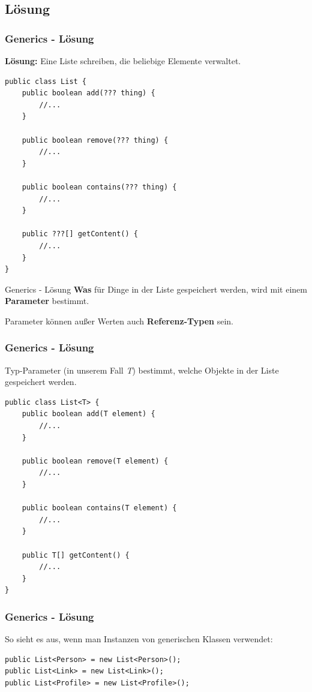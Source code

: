 \documentclass[18pt]{beamer}
\begin{document}

\subsection*{Lösung}
\begin{frame}[containsverbatim]
	\frametitle{Generics - Lösung}
	\textbf{Lösung:} Eine Liste schreiben, die beliebige Elemente verwaltet.
	\begin{lstlisting}
public class List {
	public boolean add(??? thing) {
		//...
	}
	
	public boolean remove(??? thing) {
		//...
	}
	
	public boolean contains(??? thing) {
		//...
	}
	
	public ???[] getContent() {
		//...
	}
}
	\end{lstlisting}
\end{frame}


\begin{frame}{Generics - Lösung}
	\textbf{Was} für Dinge in der Liste gespeichert werden, wird mit einem \textbf{Parameter} bestimmt.\pause
	
	Parameter können außer Werten auch \textbf{Referenz-Typen} sein.
\end{frame}


\begin{frame}[containsverbatim]
	\frametitle{Generics - Lösung}
	Typ-Parameter (in unserem Fall \emph{T}) bestimmt, welche Objekte in der Liste gespeichert werden.
	\begin{lstlisting}
public class List<T> {
	public boolean add(T element) {
		//...
	}
	
	public boolean remove(T element) {
		//...
	}
	
	public boolean contains(T element) {
		//...
	}
	
	public T[] getContent() {
		//...
	}
}
	\end{lstlisting}
\end{frame}


\begin{frame}[containsverbatim]
	\frametitle{Generics - Lösung}
	So sieht es aus, wenn man Instanzen von generischen Klassen verwendet:
	\begin{lstlisting}
public List<Person> = new List<Person>();
public List<Link> = new List<Link>();
public List<Profile> = new List<Profile>();
	\end{lstlisting}
\end{frame}
\end{document}
